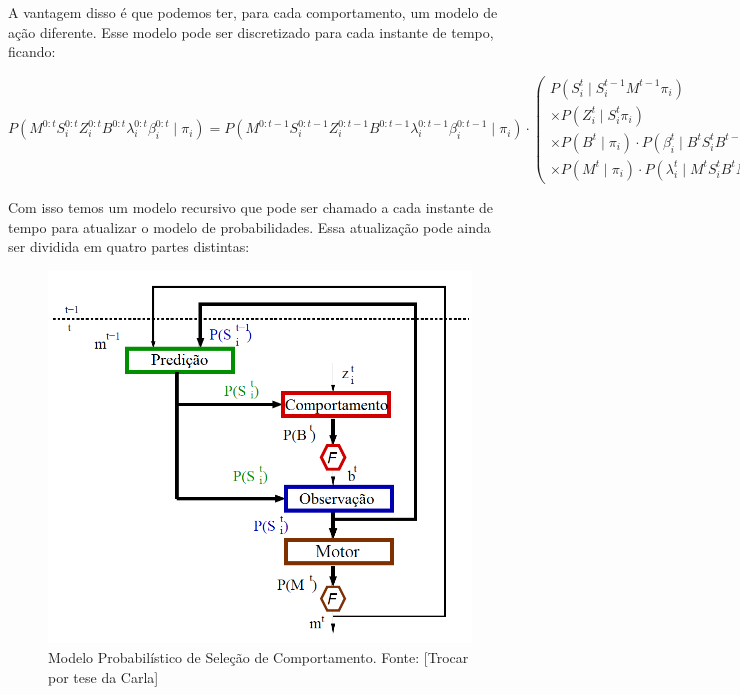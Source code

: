 A vantagem disso é que podemos ter, para cada comportamento, um modelo de ação diferente. Esse modelo pode ser discretizado para cada instante de tempo, ficando:

\begin{equation}
    P \left( M^{0: t} S_i^{0: t} Z_i^{0: t} B^{0: t} \lambda_i^{0: t} \beta_i^{0: t} \mid \pi_i \right) = P \left( M^{0:t-1} S_i^{0:t-1} Z_i^{0:t-1} B^{0:t-1} \lambda_i^{0:t-1} \beta_i^{0:t-1} \mid \pi_i \right) \cdot 
        \left(
            \begin{array}{l}
                P \left( S_i^t \mid S_i^{t -1} M^{t-1} \pi_i \right) \\
                \times P \left( Z_i^t \mid S_i^t \pi_i \right) \\
                \times P \left( B^t \mid \pi_i \right) \cdot P \left( \beta_i^t \mid B^t S_i^t B^{t-1} \pi_i \right) \\
                \times P \left( M^t \mid \pi_i \right) \cdot P \left( \lambda_i^t \mid M^t S_i^t B^t M^{t-1} \pi_i \right)
            \end{array}
        \right)
\end{equation}

Com isso temos um modelo recursivo que pode ser chamado a cada instante de tempo para atualizar o modelo de probabilidades. Essa atualização pode ainda ser dividida em quatro partes distintas:

\begin{figure}[h]
    \centering
    \includegraphics[width=120mm]{images/modelo_probabilistico-carla}
    \caption{\label{img:ModeloProbabilisticoCarla}Modelo Probabilístico de Seleção de Comportamento. Fonte: \cite{INCA2005} [Trocar por tese da Carla]}
\end{figure}

